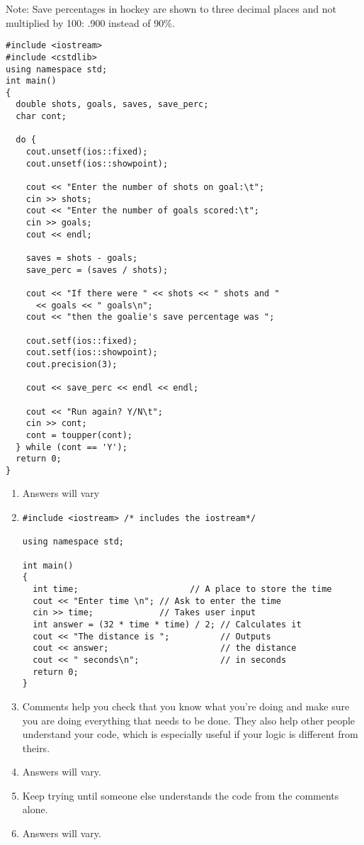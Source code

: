 \begin{enumerate}
Note: Save percentages in hockey are shown to three decimal places and not multiplied by 100: .900 instead of 90\%. \nopagebreak[4]

\noindent\begin{minipage}{\linewidth}\begin{lstlisting}
#include <iostream>
#include <cstdlib>
using namespace std;
int main()
{
  double shots, goals, saves, save_perc;
  char cont;

  do {
    cout.unsetf(ios::fixed);
    cout.unsetf(ios::showpoint);

    cout << "Enter the number of shots on goal:\t";
    cin >> shots;
    cout << "Enter the number of goals scored:\t";
    cin >> goals;
    cout << endl;

    saves = shots - goals;
    save_perc = (saves / shots);

    cout << "If there were " << shots << " shots and " 
      << goals << " goals\n";
    cout << "then the goalie's save percentage was ";

    cout.setf(ios::fixed);
    cout.setf(ios::showpoint);
    cout.precision(3);

    cout << save_perc << endl << endl;

    cout << "Run again? Y/N\t";
    cin >> cont;
    cont = toupper(cont);
  } while (cont == 'Y');
  return 0;
}
\end{lstlisting}\end{minipage}

\end{enumerate}



\begin{enumerate}
	\item Answers will vary
	\item 
\noindent\begin{minipage}{\linewidth}\begin{lstlisting}
#include <iostream> /* includes the iostream*/

using namespace std;

int main()
{
  int time;				         // A place to store the time 
  cout << "Enter time \n"; // Ask to enter the time
  cin >> time;             // Takes user input
  int answer = (32 * time * time) / 2; // Calculates it
  cout << "The distance is ";          // Outputs 
  cout << answer;                      // the distance
  cout << " seconds\n";                // in seconds 
  return 0;
}
\end{lstlisting}\end{minipage}

	\item Comments help you check that you know what you're doing and make sure you are doing everything that needs to be done.
	They also help other people understand your code, which is especially useful if your logic is different from theirs.
	\item Answers will vary.
	\item Keep trying until someone else understands the code from the comments alone.
	\item Answers will vary.

\end{enumerate}

